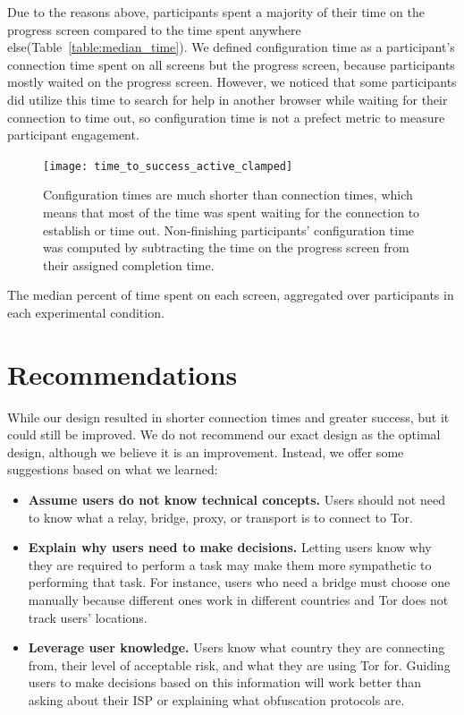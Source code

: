 \documentclass[USenglish,oneside,twocolumn]{article}
\begin{document}
Due to the reasons above, participants spent a majority of their time on the progress screen compared to the time spent anywhere else(Table~\ref{table:median_time}). We defined configuration time as a participant's connection time spent on all screens but the progress screen, because participants mostly waited on the progress screen. However, we noticed that some participants did utilize this time to search for help in another browser while waiting for their connection to time out, so configuration time is not a prefect metric to measure participant engagement. 

\begin{figure}[t]
\centering
\texttt{[image: time\_to\_success\_active\_clamped]}
\caption{
Configuration times are much shorter than connection times, which means that most of the time was spent waiting for the connection to establish or time out. Non-finishing participants' configuration time was computed by subtracting the time on the progress screen from their assigned completion time.
}
\label{fig:time_to_success_active_clamped}
\end{figure}

\begin{table}[t]
\centering

\caption{
The median percent of time spent on each screen, aggregated over participants in each experimental condition.}
\label{table:median_time}
\end{table}


\section{Recommendations}
\label{sec:recommendations}
While our design resulted in shorter connection times and greater success,  but it could still be improved. We do not recommend our exact design as the optimal design, although we believe it is an improvement. Instead, we offer some suggestions based on what we learned: \\
 
\begin{itemize}
\item {\bfseries Assume users do not know technical concepts.} Users should not need to know what a relay, bridge, proxy, or transport is to connect to Tor. 
\item {\bfseries Explain why users need to make decisions.} Letting users know why they are required to perform a task may make them more sympathetic to  performing that task. For instance, users who need a bridge must choose one manually because different ones work in different countries and Tor does not track users' locations.  
\item {\bfseries Leverage user knowledge.} Users know what country they are connecting from, their level of acceptable risk, and what they are using Tor for. Guiding users to make decisions based on this information will work better than asking about their ISP or explaining what obfuscation protocols are. 
\end{itemize}
\end{document}

